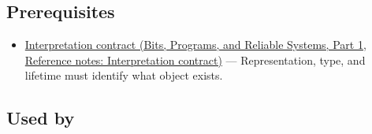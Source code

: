\subsection{Prerequisites}\label{appendix-0b104bcba06b-prerequisites}

\hypertarget{appendix-0b104bcba06b-prerequisites}{}

\begin{itemize}
\tightlist
\item
  \href{../01-Bits-Programs-and-Reliable-Systems-P01/main.pdf\#nameddest=appendix-f414bd4ed05c}{Interpretation contract (Bits, Programs, and Reliable Systems, Part 1, Reference notes: Interpretation contract)} --- Representation, type, and lifetime must identify what object exists.
\end{itemize}

\subsection{Used by}\label{appendix-0b104bcba06b-used-by}

\hypertarget{appendix-0b104bcba06b-used-by}{}

